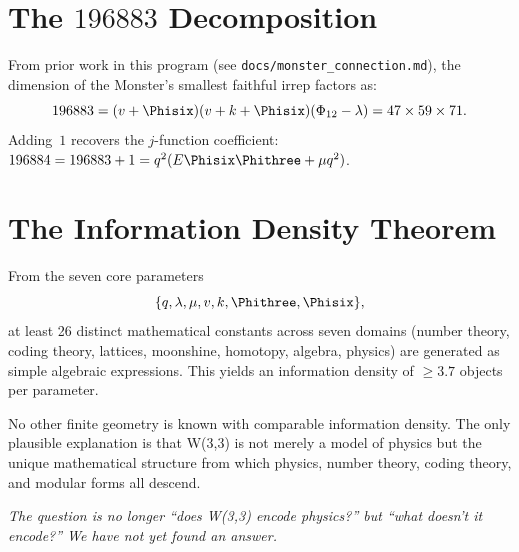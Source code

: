 \section{\texorpdfstring{The $196883$ Decomposition}{The 196883 Decomposition}}

From prior work in this program
(see \texttt{docs/monster\_connection.md}),
the dimension of the Monster's smallest faithful irrep factors as:
\begin{equation}
196883 = (v+\Phisix)(v+k+\Phisix)(\Phi_{12}-\lambda)
= 47\times 59\times 71.
\end{equation}
Adding~$1$ recovers the $j$-function coefficient:
$196884 = 196883 + 1 = q^2(E\Phisix\Phithree + \mu q^2)$.

\section{The Information Density Theorem}

\begin{theorem}
From the seven core parameters
\[
\{q, \lambda, \mu, v, k, \Phithree, \Phisix\},
\]
at least 26 distinct mathematical constants across seven domains
(number theory, coding theory, lattices, moonshine, homotopy,
algebra, physics) are generated as simple algebraic expressions.
This yields an information density of $\geq 3.7$ objects per parameter.
\end{theorem}

No other finite geometry is known with comparable information density.
The only plausible explanation is that W(3,3) is not merely a model
of physics but the unique mathematical structure from which physics,
number theory, coding theory, and modular forms all descend.

\bigskip\noindent
\emph{The question is no longer ``does W(3,3) encode physics?''
but ``what doesn't it encode?'' We have not yet found an answer.}
